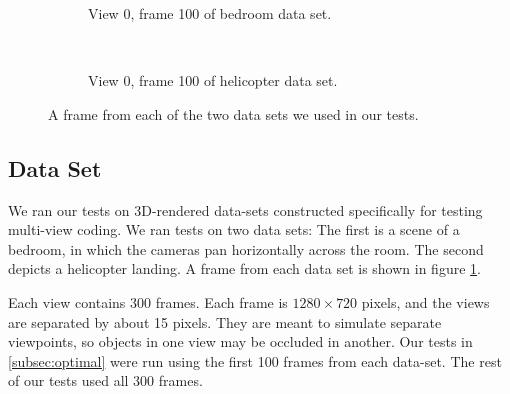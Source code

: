 \documentclass{sig-alternate-05-2015}
\begin{document}
\begin{figure}[H]
\centering
\begin{subfigure}{.5\textwidth}
\centering
{}
\caption{View 0, frame 100 of bedroom data set.}
\end{subfigure} \\
\begin{subfigure}{.5\textwidth}
\centering
{}
\caption{View 0, frame 100 of helicopter data set.}
\end{subfigure}
\caption{A frame from each of the two data sets we used in our tests.}
\label{fig:data-set}
\end{figure}

\subsection{Data Set}
\label{subsec:data-set}
We ran our tests on 3D-rendered data-sets constructed specifically for testing
multi-view coding. We ran tests on two data sets: The first is a scene of a
bedroom, in which the cameras pan horizontally across the room. The second
depicts a helicopter landing. A frame from each data set is shown in figure
\ref{fig:data-set}.

Each view contains 300 frames. Each frame is $1280\times 720$ pixels, and the
views are separated by about 15 pixels. They are meant to simulate separate
viewpoints, so objects in one view may be occluded in another. Our tests in
\ref{subsec:optimal} were run using the first 100 frames from each data-set.
The rest of our tests used all 300 frames.
\end{document}
